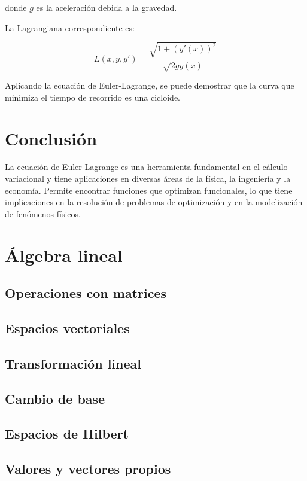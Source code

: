 donde $g$ es la aceleración debida a la gravedad.

La Lagrangiana correspondiente es:

\begin{equation}
	L(x, y, y') = \frac{\sqrt{1 + (y'(x))^2}}{\sqrt{2gy(x)}}
\end{equation}

Aplicando la ecuación de Euler-Lagrange, se puede demostrar que la curva que minimiza el tiempo de recorrido es una cicloide.

\section{Conclusión}

La ecuación de Euler-Lagrange es una herramienta fundamental en el cálculo variacional y tiene aplicaciones en diversas áreas de la física, la ingeniería y la economía.  Permite encontrar funciones que optimizan funcionales, lo que tiene implicaciones en la resolución de problemas de optimización y en la modelización de fenómenos físicos.

\section{Álgebra lineal}
\subsection{Operaciones con matrices}
\subsection{Espacios vectoriales}
\subsection{Transformación lineal}
\subsection{Cambio de base}
\subsection{Espacios de Hilbert}
\subsection{Valores y vectores propios}